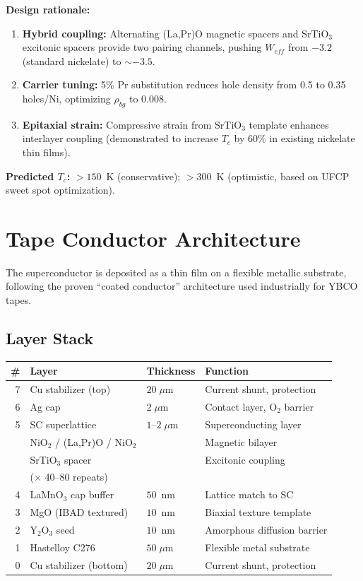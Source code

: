 \documentclass[11pt, a4paper]{article}
\begin{document}
\textbf{Design rationale:}
\begin{enumerate}[nosep]
  \item \textbf{Hybrid coupling:} Alternating (La,Pr)O magnetic
        spacers and SrTiO$_3$ excitonic spacers provide two pairing
        channels, pushing $W_{eff}$ from $-3.2$ (standard nickelate)
        to $\sim -3.5$.
  \item \textbf{Carrier tuning:} 5\% Pr substitution reduces hole
        density from 0.5 to 0.35 holes/Ni, optimizing $\rho_{bg}$
        to 0.008.
  \item \textbf{Epitaxial strain:} Compressive strain from SrTiO$_3$
        template enhances interlayer coupling (demonstrated to increase
        $T_c$ by 60\% in existing nickelate thin films).
\end{enumerate}

\textbf{Predicted $T_c$:} $> 150$~K (conservative); $> 300$~K
(optimistic, based on UFCP sweet spot optimization).

\section{Tape Conductor Architecture}
\label{sec:tape}

The superconductor is deposited as a thin film on a flexible
metallic substrate, following the proven ``coated conductor''
architecture used industrially for YBCO tapes.

\subsection{Layer Stack}

\begin{center}
\begin{tabular}{@{}rlll@{}}
\toprule
\textbf{\#} & \textbf{Layer} & \textbf{Thickness} & \textbf{Function} \\
\midrule
7 & Cu stabilizer (top) & $20\;\mu$m & Current shunt, protection \\
6 & Ag cap & $2\;\mu$m & Contact layer, O$_2$ barrier \\
5 & SC superlattice & $1$--$2\;\mu$m & Superconducting layer \\
  & \quad NiO$_2$ / (La,Pr)O / NiO$_2$ & & Magnetic bilayer \\
  & \quad SrTiO$_3$ spacer & & Excitonic coupling \\
  & \quad ($\times$ 40--80 repeats) & & \\
4 & LaMnO$_3$ cap buffer & $50$~nm & Lattice match to SC \\
3 & MgO (IBAD textured) & $10$~nm & Biaxial texture template \\
2 & Y$_2$O$_3$ seed & $10$~nm & Amorphous diffusion barrier \\
1 & Hastelloy C276 & $50\;\mu$m & Flexible metal substrate \\
0 & Cu stabilizer (bottom) & $20\;\mu$m & Current shunt, protection \\
\bottomrule
\end{tabular}
\end{center}
\end{document}
